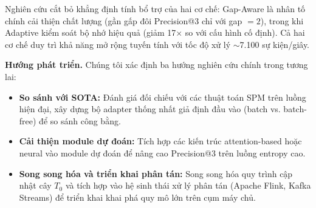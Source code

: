 \documentclass{article}
\begin{document}
Nghiên cứu cắt bỏ khẳng định tính bổ trợ của hai cơ chế: Gap-Aware là nhân tố chính cải thiện chất lượng (gần gấp đôi Precision@3 chỉ với gap $= 2$), trong khi Adaptive kiểm soát bộ nhớ hiệu quả (giảm 17$\times$ so với cấu hình cố định). Cả hai cơ chế duy trì khả năng mở rộng tuyến tính với tốc độ xử lý $\sim$7.100 sự kiện/giây.

\textbf{Hướng phát triển.} Chúng tôi xác định ba hướng nghiên cứu chính trong tương lai:
\begin{itemize}
    \item \textbf{So sánh với SOTA:} Đánh giá đối chiếu với các thuật toán SPM trên luồng hiện đại, xây dựng bộ adapter thống nhất giả định đầu vào (batch vs. batch-free) để so sánh công bằng.
    \item \textbf{Cải thiện module dự đoán:} Tích hợp các kiến trúc attention-based hoặc neural vào module dự đoán để nâng cao Precision@3 trên luồng entropy cao.
    \item \textbf{Song song hóa và triển khai phân tán:} Song song hóa quy trình cập nhật cây $T_0$ và tích hợp vào hệ sinh thái xử lý phân tán (Apache Flink, Kafka Streams) để triển khai khai phá quy mô lớn trên cụm máy chủ.
\end{itemize}



\end{document}
